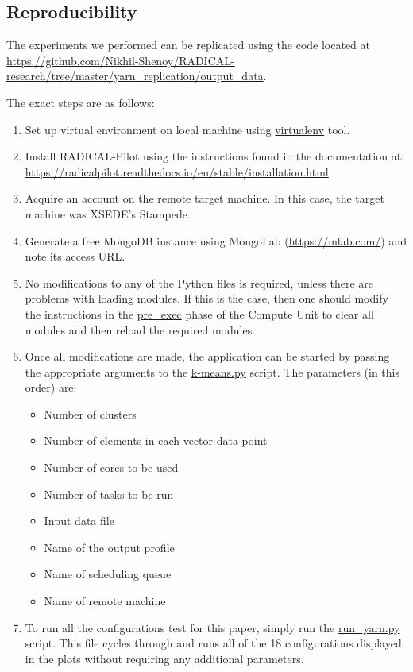 \documentclass[]{article}
\begin{document}
	\subsection{Reproducibility}
		The experiments we performed can be replicated using the code located at \url{https://github.com/Nikhil-Shenoy/RADICAL-research/tree/master/yarn_replication/output_data}.

		The exact steps are as follows:
		\begin{enumerate}
			\item Set up virtual environment on local machine using \url{virtualenv} tool.
			\item Install RADICAL-Pilot using the instructions found in the documentation at: \\
				  \url{https://radicalpilot.readthedocs.io/en/stable/installation.html}
			\item Acquire an account on the remote target machine. In this case, the target machine was XSEDE's Stampede.
			\item Generate a free MongoDB instance using MongoLab (\url{https://mlab.com/}) and note its access URL.	
			\item No modifications to any of the Python files is required, unless there are problems with loading modules. If this is the case, then one should modify the instructions in the \url{pre_exec} phase of the Compute Unit to clear all modules and then reload the required modules.
			\item Once all modifications are made, the application can be started by passing the appropriate arguments to the \url{k-means.py} script. The parameters (in this order) are:
				\begin{itemize}
					\item Number of clusters
					\item Number of elements in each vector data point
					\item Number of cores to be used
					\item Number of tasks to be run
					\item Input data file
					\item Name of the output profile
					\item Name of scheduling queue
					\item Name of remote machine
				\end{itemize}
			\item To run all the configurations test for this paper, simply run the \url{run_yarn.py} script. This file cycles through and runs all of the 18 configurations displayed in the plots without requiring any additional parameters.

\end{enumerate}
\end{document}
